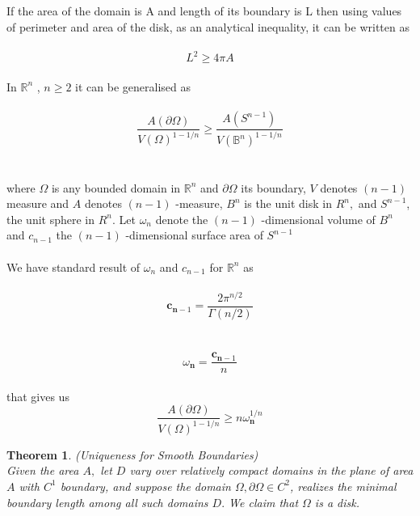 \documentclass[oneside]{book}
\newtheorem{theorem}{Theorem}[section]
\begin{document}
    If the area of the domain is A and length of its boundary is L then using values of perimeter and area of the disk,
    as an analytical inequality, it can be written as \\\\
    \begin{equation}
    L^{2} \geq 4 \pi A
        \end{equation}
      \\
        In $\mathbb{R}^{n}$ 
        , $n \geq 2$  it can be generalised as
        \\\\
       \begin{equation}
             \frac{A(\partial \Omega)}{V(\Omega)^{1-1 / n}} \geq \frac{A\left(S^{n-1}\right)}{V\left(\mathbb{B}^{n}\right)^{1-1 / n}}
          \end{equation} \\\\
        where $\Omega$ is any bounded domain in $\mathbb{R}^{n}$ and $\partial \Omega$ its boundary, $V$ denotes $(n-1)$
measure and $A$ denotes $(n-1)$ -measure, $B^{n}$ is the unit disk in $R^{n},$ and $S^{n-1}$,
the unit sphere in $R^{n}$.
Let $\omega_{n}$ denote the $(n-1)$ -dimensional volume of $B^{n}$ and  $c_{n-1}$ the $(n-1)$ -dimensional surface area of $S^{n-1}$ \\\\



We have standard result of $\omega_{n}$ and $c_{n-1}$ for $\mathbb{R}^{n}$ as  \\\\
    \begin{equation}
\mathbf{c}_{\mathbf{n}-1} = \frac{2 \pi^{n / 2}}{\Gamma(n / 2)}
    \end{equation}
    \\\\
        \begin{equation}
 \omega_{\mathbf{n} } = \frac{\mathbf{c}_{\mathbf{n}-1}}{n}  
    \end{equation} \\
that gives us \\
    \begin{equation}
 \frac{A(\partial \Omega)}{V(\Omega)^{1-1 / n}} \geq n \omega_{\mathbf{n}}^{1 / n}
    \end{equation}






\begin{theorem}{(Uniqueness for Smooth Boundaries)} \\
 Given
the area $A,$ let $D$ vary over relatively compact domains in the plane of area $A$
with $C^{1}$ boundary, and suppose the domain $\Omega, \partial \Omega \in C^{2}$, realizes the minimal
boundary length among all such domains $D .$ We claim that $\Omega$ is a disk.
\end{theorem}
\end{document}
